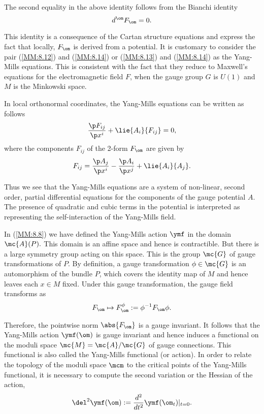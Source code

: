 The second equality in the above identity follows from the Bianchi identity
\begin{equation}
 \label{MM:8.14}
 d^{\om}F_{\om}=0.
\end{equation}

This identity is a consequence of the Cartan structure equations and express the fact that locally, $F_{\om}$ is
derived from a potential. It is customary to consider the pair (\ref{MM:8.12}) and (\ref{MM:8.14}) or (\ref{MM:8.13})
and (\ref{MM:8.14}) as the Yang-Mills equations. This is consistent with the fact that they reduce to Maxwell's
equations for the electromagnetic field $F$, when the gauge group $G$ is $U(1)$ and $M$ is the Minkowski space.

In local orthonormal coordinates, the Yang-Mills equations can be written as follows
\begin{equation}
 \label{MM:8.15}
 \frac{\p F_{ij}}{\p x^{i}}+\lie{A_{i}}{F_{ij}}=0,
 \end{equation}
where the components $F_{ij}$ of the 2-form $F_{\om}$ are given by
\begin{equation}
 \label{MM:8.16}
 F_{ij}=\frac{\p A_{j}}{\p x^{i}}-\frac{\p A_{i}}{\p x^{j}}+\lie{A_{i}}{A_{j}}.
\end{equation}

Thus we see that the Yang-Mills equations are a system of non-linear, second order, partial differential equations for
the components of the gauge potential $A$. The presence of quadratic and cubic terms in the potential is interpreted as
representing the self-interaction of the Yang-Mills field.

In (\ref{MM:8.8}) we have defined the Yang-Mills action $\ymf$ in the domain $\mc{A}(P).$ This domain is an affine
space and hence is contractible. But there is a large symmetry group acting on this space. This is the group $\mc{G}$
of gauge transformations of $P.$ By definition, a gauge transformation $\phi \in \mc{G}$ is an automorphism of the
bundle $P$, which covers the identity map of $M$ and hence leaves each $x\in M$ fixed. Under this gauge transformation,
the gauge field transforms as
$$
F_{\om} \mapsto F^{\phi}_{\om}:=\phi^{-1}F_{\om} \phi.
$$

Therefore, the pointwise norm $\abs{F_{\om}}$ is a gauge invariant. It follows that the Yang-Mills action $\ymf(\om)$
is gauge invariant and hence induces a functional on the moduli space $\mc{M}=\mc{A}/\mc{G}$ of gauge connections. This
functional is also called the Yang-Mills functional (or action). In order to relate the topology of the moduli space
$\mcm$ to the critical points of the Yang-Mills functional, it is necessary to compute the second variation or the
Hessian of the \ym action,
$$
\del^{2}\ymf(\om):=\frac{d^{2}}{dt^{2}}\ymf(\om_{t})|_{t=0}.
$$

